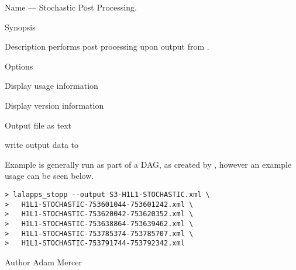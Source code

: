 \begin{entry}
\item[Name]
 --- Stochastic Post Processing.

\item[Synopsis]
  \newline \hspace*{0.5in}
 \newline \hspace*{0.5in}
 \newline \hspace*{0.5in}
 \newline \hspace*{0.5in}
 

\item[Description]  performs post processing upon
output from .

\item[Options]\leavevmode
\begin{entry}
\item[\option{--help}]
Display usage information
\item[\option{--version}]
Display version information
\item[\option{--text}]
Output file as text
\item[\option{--output} \parm{FILE}]
write output data to 
\end{entry}

\item[Example]
 is generally run as part of a DAG, as created by
, however an example usage can be seen
below.

\begin{verbatim}
> lalapps_stopp --output S3-H1L1-STOCHASTIC.xml \
>   H1L1-STOCHASTIC-753601044-753601242.xml \
>   H1L1-STOCHASTIC-753620042-753620352.xml \
>   H1L1-STOCHASTIC-753638864-753639462.xml \
>   H1L1-STOCHASTIC-753785374-753785707.xml \
>   H1L1-STOCHASTIC-753791744-753792342.xml
\end{verbatim}

\item[Author]
Adam Mercer
\end{entry}

